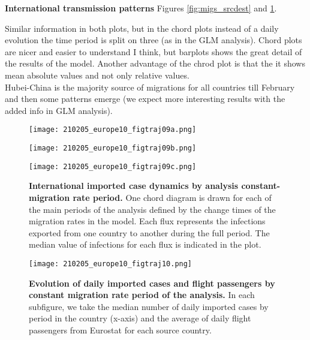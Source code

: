 \textbf{International transmission patterns}
Figures \ref{fig:migs_srcdest} and \ref{fig:migs}.\\

Similar information in both plots, but in the chord plots instead of a daily evolution the time period is split on three (as in the GLM analysis). Chord plots are nicer and easier to understand I think, but barplots shows the great detail of the results of the model. Another advantage of the chrod plot is that the it shows mean absolute values and not only relative values.\\

Hubei-China is the majority source of migrations for all countries till February and then some patterns emerge (we expect more interesting results with the added info in GLM analysis).\\


\begin{figure}[!tbp]
  \centering

  \begin{minipage}[t]{0.4\textwidth}
  \texttt{[image: 210205\_europe10\_figtraj09a.png]}
  \label{fig:migs1}
  \end{minipage}
  \begin{minipage}[t]{0.4\textwidth}
  \texttt{[image: 210205\_europe10\_figtraj09b.png]}
  \label{fig:migs2}
  \end{minipage}
  \begin{minipage}[t]{0.4\textwidth}
  \texttt{[image: 210205\_europe10\_figtraj09c.png]}
  \label{fig:migs3}
  \end{minipage}
  \caption{\textbf{International imported case dynamics by analysis constant-migration rate period.} One chord diagram is drawn for each of the main periods of the analysis defined by the change times of the migration rates in the model. Each flux represents the infections exported from one country to another during the full period. The median value of infections for each flux is indicated in the plot.}
  \label{fig:migs}
\end{figure}



\begin{figure}[p]
    \centering
    \texttt{[image: 210205\_europe10\_figtraj10.png]}
    \caption{\textbf{Evolution of daily imported cases and flight passengers by constant migration rate period of the analysis.} In each subfigure, we take the median number of daily imported cases by period in the country (x-axis) and the average of daily flight passengers from Eurostat for each source country.}
    \label{fig:migsflights}
\end{figure}


